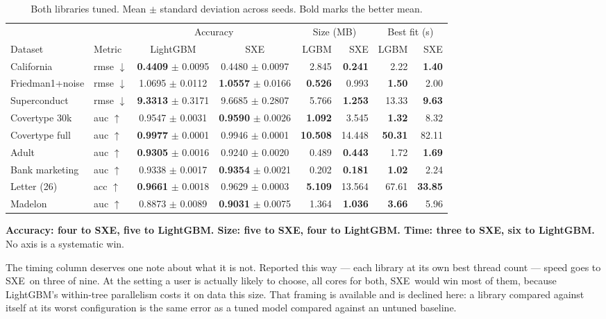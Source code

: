 \documentclass[11pt,a4paper]{article}
\newcommand{\SXE}{\textsc{SXE}}
\theoremstyle{definition}
\begin{document}
\begin{table}[h]
\centering
\small
\caption{Both libraries tuned. Mean $\pm$ standard deviation across seeds.
Bold marks the better mean.}
\setlength{\tabcolsep}{4pt}
\begin{tabular}{llccrrrr}
\toprule
& & \multicolumn{2}{c}{Accuracy} & \multicolumn{2}{c}{Size (MB)} & \multicolumn{2}{c}{Best fit (s)} \\
\cmidrule(lr){3-4}\cmidrule(lr){5-6}\cmidrule(lr){7-8}
Dataset & Metric & LightGBM & \SXE & LGBM & \SXE & LGBM & \SXE \\
\midrule
California      & rmse $\downarrow$ & \textbf{0.4409} $\pm$ 0.0095 & 0.4480 $\pm$ 0.0097 & 2.845 & \textbf{0.241} & 2.22 & \textbf{1.40} \\
Friedman1+noise & rmse $\downarrow$ & 1.0695 $\pm$ 0.0112 & \textbf{1.0557} $\pm$ 0.0166 & \textbf{0.526} & 0.993 & \textbf{1.50} & 2.00 \\
Superconduct    & rmse $\downarrow$ & \textbf{9.3313} $\pm$ 0.3171 & 9.6685 $\pm$ 0.2807 & 5.766 & \textbf{1.253} & 13.33 & \textbf{9.63} \\
Covertype 30k   & auc $\uparrow$    & 0.9547 $\pm$ 0.0031 & \textbf{0.9590} $\pm$ 0.0026 & \textbf{1.092} & 3.545 & \textbf{1.32} & 8.32 \\
Covertype full  & auc $\uparrow$    & \textbf{0.9977} $\pm$ 0.0001 & 0.9946 $\pm$ 0.0001 & \textbf{10.508} & 14.448 & \textbf{50.31} & 82.11 \\
Adult           & auc $\uparrow$    & \textbf{0.9305} $\pm$ 0.0016 & 0.9240 $\pm$ 0.0020 & 0.489 & \textbf{0.443} & 1.72 & \textbf{1.69} \\
Bank marketing  & auc $\uparrow$    & 0.9338 $\pm$ 0.0017 & \textbf{0.9354} $\pm$ 0.0021 & 0.202 & \textbf{0.181} & \textbf{1.02} & 2.24 \\
Letter (26)     & acc $\uparrow$    & \textbf{0.9661} $\pm$ 0.0018 & 0.9629 $\pm$ 0.0003 & \textbf{5.109} & 13.564 & 67.61 & \textbf{33.85} \\
Madelon         & auc $\uparrow$    & 0.8873 $\pm$ 0.0089 & \textbf{0.9031} $\pm$ 0.0075 & 1.364 & \textbf{1.036} & \textbf{3.66} & 5.96 \\
\bottomrule
\end{tabular}
\end{table}

\noindent
\textbf{Accuracy: four to \SXE, five to LightGBM. Size: five to \SXE, four to
LightGBM. Time: three to \SXE, six to LightGBM.} No axis is a systematic win.

The timing column deserves one note about what it is not. Reported this way ---
each library at its own best thread count --- speed goes to \SXE\ on three of
nine. At the setting a user is actually likely to choose, all cores for both,
\SXE\ would win most of them, because LightGBM's within-tree parallelism costs
it on data this size. That framing is available and is declined here: a library
compared against itself at its worst configuration is the same error as a tuned
model compared against an untuned baseline.
\end{document}
